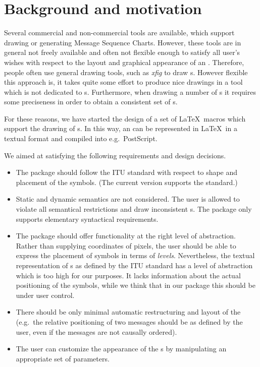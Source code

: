 \documentclass[12pt,a4paper]{article}
\begin{document}
\section{Background and motivation}
\label{background}
Several commercial and non-commercial tools are available, which
support drawing or generating Message Sequence Charts. However, these
tools are in general not freely available and often not flexible
enough to satisfy all user's wishes with respect to the layout and
graphical appearance of an \MSC{}.
Therefore, people often use general drawing tools, such as {\em xfig}
to draw \MSC{}s. However flexible this approach is, it takes quite some
effort to produce nice \MSC{} drawings in a tool which is not dedicated
to \MSC{}s. Furthermore, when drawing a number of \MSC{}s it requires some
preciseness in order to obtain a consistent set of \MSC{}s.

For these reasons, we have started the design of a set of
\LaTeX\ macros which support the drawing of \MSC{}s. In this way, an \MSC{} can be
represented in \LaTeX\ in a textual format and compiled into
e.g.\ PostScript.

We aimed at satisfying the following requirements and design
decisions.
\begin{itemize}
\item
The package should follow the ITU standard with respect to shape and
placement of the symbols. (The current version supports
the  standard.)
\item
Static and dynamic semantics are not considered. The user is allowed
to violate all semantical restrictions and draw inconsistent \MSC{}s.
The package only supports elementary syntactical requirements.
\item
The package should offer functionality at the right level of
abstraction. Rather than supplying coordinates of pixels, the
user should be able to express the placement of symbols in terms of
{\em levels}.
Nevertheless, the textual representation of \MSC{}s as defined by the ITU
standard has a level of abstraction which is too high for our purposes.
It lacks information about the actual positioning of the \MSC{} symbols,
while we think that in our package this should be under user control.
\item
There should be only minimal automatic restructuring and layout of the
\MSC{} (e.g.\ the relative positioning of two messages should be as
defined by the user, even if the messages are not causally ordered).
\item
The user can customize the appearance of the \MSC{}s by manipulating
an appropriate set of parameters.
\end{itemize}
\end{document}
